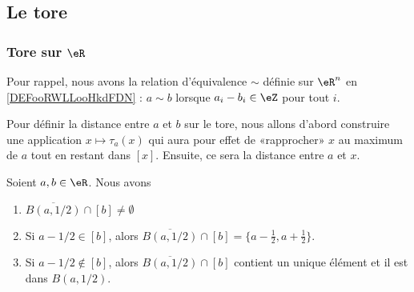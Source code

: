 \subsection{Le tore}

\subsubsection{Tore sur \( \eR\)}

Pour rappel, nous avons la relation d'équivalence \( \sim\) définie sur \( \eR^n\) en \ref{DEFooRWLLooHkdFDN} : \( a\sim b\) lorsque \( a_i-b_i\in \eZ\) pour tout \( i\).

Pour définir la distance entre \( a\) et \( b\) sur le tore, nous allons d'abord construire une application \(x\mapsto \tau_a(x)\) qui aura pour effet de «rapprocher» \( x\) au maximum de \( a\) tout en restant dans \( [x]\). Ensuite, ce sera la distance entre \( a\) et \( x\).

\begin{lemma}	\label{LEMooJRQZooLCXOWQ}
	Soient \( a,b\in \eR\). Nous avons
	\begin{enumerate}
		\item		\label{ITEMooBDAQooSYWkMX}
		      \( \overline{B(a,1/2)}\cap[b]\neq \emptyset\)
		\item		\label{ITEMooRSAKooLzvllq}
		      Si \( a-1/2\in[b]\), alors \( \overline{B(a,1/2)}\cap[b]=\{ a-\frac{ 1 }{2},a+\frac{ 1 }{2} \}\).
		\item		\label{ITEMooANPJooAdrPTK}
		      Si \( a-1/2\not\in[b]\), alors \( \overline{B(a,1/2)}\cap[b]\) contient un unique élément et il est dans \( B(a,1/2)\).
	\end{enumerate}
\end{lemma}

